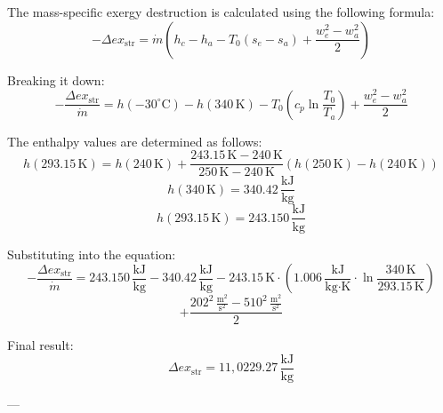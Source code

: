 The mass-specific exergy destruction is calculated using the following formula:  
\[
-\Delta ex_{\text{str}} = \dot{m} \left( h_c - h_a - T_0 (s_e - s_a) + \frac{w_e^2 - w_a^2}{2} \right)
\]  

Breaking it down:  
\[
-\frac{\Delta ex_{\text{str}}}{\dot{m}} = h(-30^\circ\text{C}) - h(340 \, \text{K}) - T_0 \left( c_p \ln \frac{T_0}{T_a} \right) + \frac{w_e^2 - w_a^2}{2}
\]  

The enthalpy values are determined as follows:  
\[
h(293.15 \, \text{K}) = h(240 \, \text{K}) + \frac{243.15 \, \text{K} - 240 \, \text{K}}{250 \, \text{K} - 240 \, \text{K}} \left( h(250 \, \text{K}) - h(240 \, \text{K}) \right)
\]  
\[
h(340 \, \text{K}) = 340.42 \, \frac{\text{kJ}}{\text{kg}}
\]  
\[
h(293.15 \, \text{K}) = 243.150 \, \frac{\text{kJ}}{\text{kg}}
\]  

Substituting into the equation:  
\[
-\frac{\Delta ex_{\text{str}}}{\dot{m}} = 243.150 \, \frac{\text{kJ}}{\text{kg}} - 340.42 \, \frac{\text{kJ}}{\text{kg}} - 243.15 \, \text{K} \cdot (1.006 \, \frac{\text{kJ}}{\text{kg·K}} \cdot \ln \frac{340 \, \text{K}}{293.15 \, \text{K}})
\]  
\[
+ \frac{202^2 \, \frac{\text{m}^2}{\text{s}^2} - 510^2 \, \frac{\text{m}^2}{\text{s}^2}}{2}
\]  

Final result:  
\[
\Delta ex_{\text{str}} = 11,0229.27 \, \frac{\text{kJ}}{\text{kg}}
\]  

---